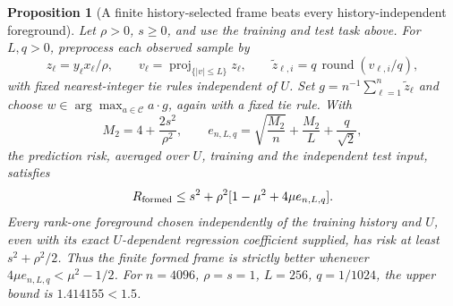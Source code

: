 \documentclass[12pt]{article}
\newtheorem{proposition}[theorem]{Proposition}
\theoremstyle{definition}
\begin{document}
\begin{proposition}[A finite history-selected frame beats every history-independent foreground]
\label{prop:finite-formation}
Let $\rho>0$, $s\ge0$, and use the training and test task above.
For $L,q>0$, preprocess each observed sample by
\[
 z_\ell=y_\ell x_\ell/\rho,\qquad
 v_\ell=\operatorname{proj}_{\{|v|\le L\}}z_\ell,\qquad
 \widetilde z_{\ell,i}=q\,\operatorname{round}(v_{\ell,i}/q),
\]
with fixed nearest-integer tie rules independent of $U$.
Set $g=n^{-1}\sum_{\ell=1}^n\widetilde z_\ell$ and choose
$w\in\arg\max_{a\in\mathcal C}a\cdot g$, again with a fixed tie rule.
With
\begin{equation}
 M_2=4+\frac{2s^2}{\rho^2},\qquad
 e_{n,L,q}=\sqrt{\frac{M_2}{n}}+\frac{M_2}{L}
                                     +\frac q{\sqrt2},
 \label{eq:finite-frame-error}
\end{equation}
the prediction risk, averaged over $U$, training and the independent
test input, satisfies
\begin{equation}
 R_{\rm formed}\le s^2+\rho^2
           [1-\mu^2+4\mu e_{n,L,q}].
 \label{eq:finite-frame-risk}
\end{equation}
Every rank-one foreground chosen independently of the training history
and $U$, even with its exact $U$-dependent regression coefficient
supplied, has risk at least $s^2+\rho^2/2$.
Thus the finite formed frame is strictly better whenever
$4\mu e_{n,L,q}<\mu^2-1/2$.
For $n=4096$, $\rho=s=1$, $L=256$, $q=1/1024$, the upper bound is
$1.414155<1.5$.
\end{proposition}
\end{document}

